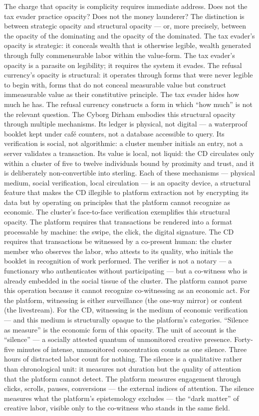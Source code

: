 The charge that opacity is complicity requires immediate address. Does not the tax evader practice opacity? Does not the money launderer? The distinction is between strategic opacity and structural opacity — or, more precisely, between the opacity of the dominating and the opacity of the dominated. The tax evader’s opacity is strategic: it conceals wealth that is otherwise legible, wealth generated through fully commensurable labor within the value-form. The tax evader’s opacity is a parasite on legibility; it requires the system it evades. The refusal currency’s opacity is structural: it operates through forms that were never legible to begin with, forms that do not conceal measurable value but construct immeasurable value as their constitutive principle. The tax evader hides how much he has. The refusal currency constructs a form in which “how much” is not the relevant question. The Cyborg Dirham embodies this structural opacity through multiple mechanisms. Its ledger is physical, not digital — a waterproof booklet kept under café counters, not a database accessible to query. Its verification is social, not algorithmic: a cluster member initials an entry, not a server validates a transaction. Its value is local, not liquid: the CD circulates only within a cluster of five to twelve individuals bound by proximity and trust, and it is deliberately non-convertible into sterling. Each of these mechanisms — physical medium, social verification, local circulation — is an opacity device, a structural feature that makes the CD illegible to platform extraction not by encrypting its data but by operating on principles that the platform cannot recognize as economic. The cluster’s face-to-face verification exemplifies this structural opacity. The platform requires that transactions be rendered into a format processable by machine: the swipe, the click, the digital signature. The CD requires that transactions be witnessed by a co-present human: the cluster member who observes the labor, who attests to its quality, who initials the booklet in recognition of work performed. The verifier is not a notary — a functionary who authenticates without participating — but a co-witness who is already embedded in the social tissue of the cluster. The platform cannot parse this operation because it cannot recognize co-witnessing as an economic act. For the platform, witnessing is either surveillance (the one-way mirror) or content (the livestream). For the CD, witnessing is the medium of economic verification — and this medium is structurally opaque to the platform’s categories. “Silence as measure” is the economic form of this opacity. The unit of account is the “silence” — a socially attested quantum of unmonitored creative presence. Forty-five minutes of intense, unmonitored concentration counts as one silence. Three hours of distracted labor count for nothing. The silence is a qualitative rather than chronological unit: it measures not duration but the quality of attention that the platform cannot detect. The platform measures engagement through clicks, scrolls, pauses, conversions — the external indices of attention. The silence measures what the platform’s epistemology excludes — the “dark matter” of creative labor, visible only to the co-witness who stands in the same field.

